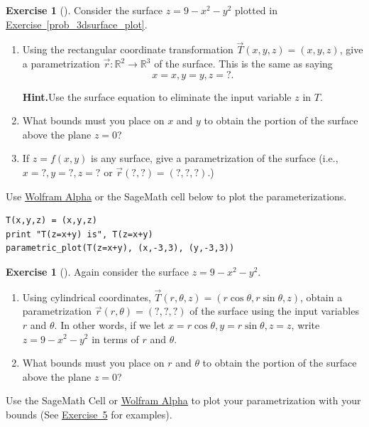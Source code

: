 \documentclass[10pt,]{book}
\theoremstyle{plain}
\theoremstyle{definition}
\theoremstyle{definition}
\theoremstyle{definition}
\theoremstyle{definition}
\newtheorem{exploration}[project]{Exercise}
\theoremstyle{definition}
\numberwithin{equation}{section}
\begin{document}
\begin{exploration}[]\label{x3d_parametric_plot}
Consider the surface \(z=9-x^2-y^2\) plotted in \hyperref[prob_3dsurface_plot]{Exercise~\ref{prob_3dsurface_plot}}.%
\begin{enumerate}[font=\bfseries,label=(\alph*),ref=\alph*]
\item\label{task-244} Using the rectangular coordinate transformation \(\vec T(x,y,z)=(x,y,z)\), give a parametrization \(\vec r\colon \mathbb{R}^2\to\mathbb{R}^3\) of the surface. This is the same as saying%
\begin{equation*}
x=x, y=y, z=?.
\end{equation*}
%
\par\medskip\noindent%
\textbf{Hint.}\quad Use the surface equation to eliminate the input variable \(z\) in \(T\).%
\item\label{task-245} What bounds must you place on \(x\) and \(y\) to obtain the portion of the surface above the plane \(z=0\)?%
\item\label{general_param_3d} If \(z=f(x,y)\) is any surface, give a parametrization of the surface (i.e., \(x=?, y=?, z=?\) or \(\vec r (?,?)=(?,?,?)\).)%
\end{enumerate}
\bigbreak
Use \href{http://wolfr.am/zk2KTu}{Wolfram Alpha} or the SageMath cell below to plot the parameterizations.%
\begin{lstlisting}[style=sageinput]
T(x,y,z) = (x,y,z)
print "T(z=x+y) is", T(z=x+y)
parametric_plot(T(z=x+y), (x,-3,3), (y,-3,3))
\end{lstlisting}
\end{exploration}
\begin{exploration}[]\label{exploration-126}
Again consider the surface \(z=9-x^2-y^2\).%
\begin{enumerate}[font=\bfseries,label=(\alph*),ref=\alph*]
\item\label{task-247} Using cylindrical coordinates, \(\vec T(r,\theta,z) = (r\cos \theta, r\sin\theta, z)\), obtain a parametrization \(\vec r(r,\theta)=(?,?,?)\) of the surface using the input variables \(r\) and \(\theta\). In other words, if we let \(x=r\cos \theta, y=r\sin\theta, z=z\), write \(z=9-x^2-y^2\) in terms of \(r\) and \(\theta\).%
\item\label{task-248} What bounds must you place on \(r\) and \(\theta\) to obtain the portion of the surface above the plane \(z=0\)?%
\end{enumerate}
\bigbreak
Use the SageMath Cell or \href{http://wolframalpha.com}{Wolfram Alpha} to plot your parametrization with your bounds (See \hyperref[x3d_parametric_plot]{Exercise~5} for examples).%
\begin{lstlisting}[style=sageinput]

\end{lstlisting}
\end{exploration}
\end{document}
